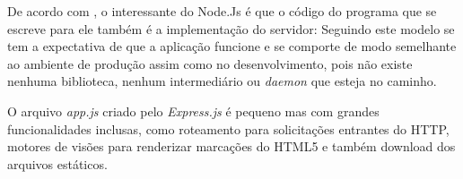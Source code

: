   
  De acordo com , o interessante do Node.Js é que o código do 
  programa que se escreve para ele também é a implementação do servidor: 
  Seguindo este modelo se tem a expectativa de que a aplicação funcione e se comporte de modo semelhante 
  ao ambiente de produção assim como no desenvolvimento, pois não existe nenhuma biblioteca, nenhum intermediário 
  ou \textit{daemon} que esteja no caminho.
  
  O arquivo \textit{app.js} criado pelo \textit{Express.js} é pequeno mas com grandes funcionalidades inclusas, como 
  roteamento para solicitações entrantes do \ac{HTTP}, motores de visões para renderizar marcações do HTML5
  e também download dos arquivos estáticos.